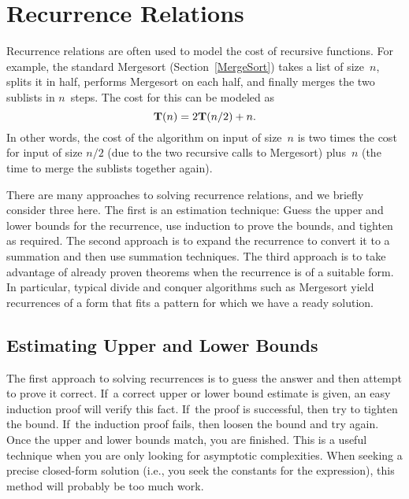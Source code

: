 \section{Recurrence Relations}
\label{Recurrence}

Recurrence relations are often used to model the cost of recursive
functions.
For example, the standard Mergesort
(Section~\ref{MergeSort}) takes a
list of size~\(n\), splits it in half, performs Mergesort on each half,
and finally merges the two sublists in \(n\)~steps.
The cost for this can be modeled as
\[{\bf T}(n) = 2{\bf T}(n/2) + n.\]
\noindent In other words, the cost of the algorithm on input of
size~\(n\) is two times the cost for input of size \(n/2\) (due to the two
recursive calls to Mergesort) plus~\(n\) (the time to merge the sublists
together again).

There are many approaches to solving recurrence relations, and we
briefly consider three here.
The first is an estimation technique:
Guess the upper and lower bounds for the recurrence, use
induction to prove the bounds, and tighten as
required.
The second approach is to expand the recurrence to convert it to a
summation and then use summation techniques.
The third approach is to take advantage of already proven theorems
when the recurrence is of a suitable form.
In particular, typical divide and conquer algorithms such as
Mergesort yield recurrences of a form that fits a pattern for which
we have a ready solution.

\subsection{Estimating Upper and Lower Bounds}

The first approach to solving recurrences is to guess the
answer and then attempt to prove it correct.
If~a correct upper or lower bound estimate is given, 
an easy induction proof will verify this fact.
If~the proof is successful, then try to tighten the bound.
If~the induction proof fails, then loosen the bound and try again.
Once the upper and lower bounds match, you are finished.
This is a useful technique when you are only looking for asymptotic
complexities.
When seeking a precise closed-form solution (i.e., you seek the
constants for the expression), this method will probably be too much
work.

